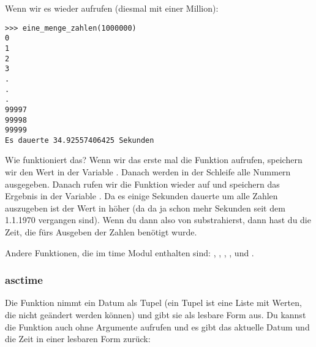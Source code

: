 \noindent
Wenn wir es wieder aufrufen (diesmal mit einer Million):

\begin{Verbatim}[frame=single]
>>> eine_menge_zahlen(1000000)
0
1
2
3
.
.
.
99997
99998
99999
Es dauerte 34.92557406425 Sekunden
\end{Verbatim}

\noindent
Wie funktioniert das? Wenn wir das erste mal die  Funktion aufrufen, speichern wir den Wert in der Variable . Danach werden in der Schleife alle Nummern ausgegeben. Danach rufen wir die  Funktion wieder auf und speichern das Ergebnis in der Variable . Da es einige Sekunden dauerte um alle Zahlen auszugeben ist der Wert in  höher (da da ja schon mehr Sekunden seit dem 1.1.1970 vergangen sind). Wenn du dann also  von  substrahierst, dann hast du die Zeit, die fürs Ausgeben der Zahlen benötigt wurde.

Andere Funktionen, die im time Modul enthalten sind: , , , ,  und .

\subsubsection*{asctime}
Die Funktion  nimmt ein Datum als Tupel (ein Tupel ist eine Liste mit Werten, die nicht geändert werden können) und gibt sie als lesbare Form aus. Du kannst die Funktion auch ohne Argumente aufrufen und es gibt das aktuelle Datum und die Zeit in einer lesbaren Form zurück:

